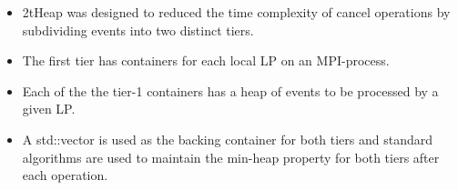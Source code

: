 \documentclass[table]{beamer}
\begin{document}
\begin{frame}
\begin{itemize}
\item 2tHeap was designed to reduced the time complexity of cancel operations by subdividing events into two  distinct tiers.
\item The first tier has containers for each local LP on an MPI-process.
\item Each of the the tier-1 containers has a heap of events to be processed by a given LP.
\item A std::vector is used as the backing container for both tiers and standard algorithms are used to maintain the min-heap property for both tiers after each operation.
\end{itemize}
\end{frame}

\end{document}
